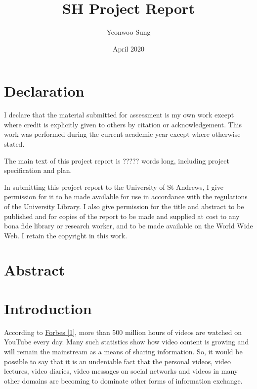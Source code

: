 \documentclass{article}
\title{SH Project Report}
\author{Yeonwoo Sung}
\date{April 2020}
\begin{document}
\maketitle

\newpage

\section*{Declaration}
I declare that the material submitted for assessment is my own work except where credit is explicitly given to others by citation or acknowledgement. 
This work was performed during the current academic year except where otherwise stated.

The main text of this project report is ????? words long, including project specification and plan.

In submitting this project report to the University of St Andrews, I give permission for it to be made 
available for use in accordance with the regulations of the University Library. I also give permission for 
the title and abstract to be published and for copies of the report to be made and supplied at cost to any bona fide 
library or research worker, and to be made available on the World Wide Web. I retain the copyright in this work.

\newpage

\section*{Abstract}

\newpage

\tableofcontents

\newpage

\section{Introduction}

According to \hyperlink{ref1}{Forbes [1]}, more than 500 million hours of videos are watched on YouTube every day. Many such statistics show how video content is growing and will remain the mainstream as a means of sharing information. So, it would be possible to say that it is an undeniable fact that the personal videos, video lectures, video diaries, video messages on social networks and videos in many other domains are becoming to dominate other forms of information exchange.
\end{document}
